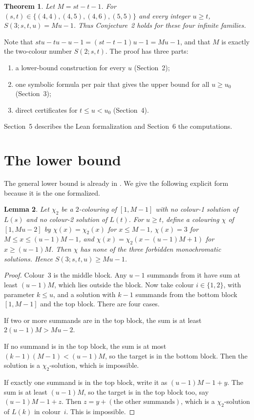 \documentclass[11pt]{amsart}
\newtheorem{theorem}{Theorem}[section]
\newtheorem{lemma}[theorem]{Lemma}
\theoremstyle{definition}
\begin{document}
\begin{theorem}
Let $M=st-t-1$. For $(s,t)\in\{(4,4),(4,5),(4,6),(5,5)\}$ and every
integer $u\ge t$, $S(3;s,t,u)=Mu-1$. Thus Conjecture~2 holds for
these four infinite families.
\end{theorem}

Note that $stu-tu-u-1=(st-t-1)u-1=Mu-1$, and that $M$ is exactly the
two-colour number $S(2;s,t)$. The proof has three parts:
\begin{enumerate}
\item a lower-bound construction for every $u$ (Section~2);
\item one symbolic formula per pair that gives the upper bound for
all $u\ge u_0$ (Section~3);
\item direct certificates for $t\le u<u_0$ (Section~4).
\end{enumerate}
Section~5 describes the Lean formalization and Section~6 the
computations.

\section{The lower bound}

The general lower bound is already in \cite{AS16}. We give the
following explicit form because it is the one formalized.

\begin{lemma}\label{lem:lower}
Let $\chi_2$ be a $2$-colouring of $[1,M-1]$ with no colour-1
solution of $L(s)$ and no colour-2 solution of $L(t)$. For $u\ge t$,
define a colouring $\chi$ of $[1,Mu-2]$ by $\chi(x)=\chi_2(x)$ for
$x\le M-1$, $\chi(x)=3$ for $M\le x\le (u-1)M-1$, and
$\chi(x)=\chi_2(x-(u-1)M+1)$ for $x\ge (u-1)M$. Then $\chi$ has none
of the three forbidden monochromatic solutions. Hence
$S(3;s,t,u)\ge Mu-1$.
\end{lemma}

\begin{proof}
Colour~3 is the middle block. Any $u-1$ summands from it have sum at
least $(u-1)M$, which lies outside the block. Now take colour
$i\in\{1,2\}$, with parameter $k\le u$, and a solution with $k-1$
summands from the bottom block $[1,M-1]$ and the top block. There are
four cases.

If two or more summands are in the top block, the sum is at least
$2(u-1)M>Mu-2$.

If no summand is in the top block, the sum is at most
$(k-1)(M-1)<(u-1)M$, so the target is in the bottom block. Then the
solution is a $\chi_2$-solution, which is impossible.

If exactly one summand is in the top block, write it as
$(u-1)M-1+y$. The sum is at least $(u-1)M$, so the target is in the
top block too, say $(u-1)M-1+z$. Then $z=y+(\text{the other
summands})$, which is a $\chi_2$-solution of $L(k)$ in colour~$i$.
This is impossible.
\end{proof}
\end{document}
